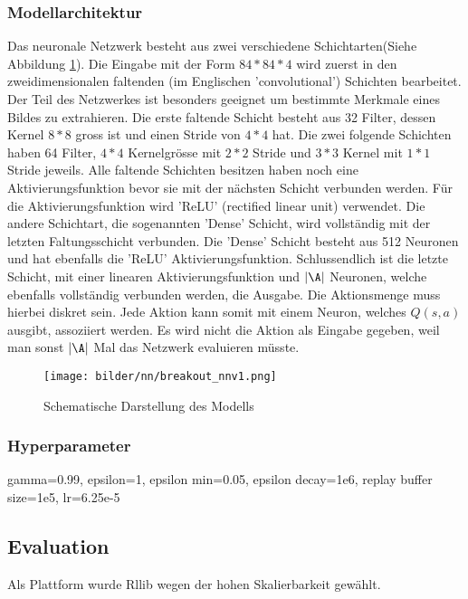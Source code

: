 \documentclass[a4paper,titlepage]{article}
\numberwithin{equation}{section} %
\begin{document}
{\subsubsection{Modellarchitektur}
Das neuronale Netzwerk besteht aus zwei verschiedene Schichtarten(Siehe Abbildung \ref{fig:breakout_nn}). Die Eingabe mit der Form $84*84*4$ wird zuerst in den zweidimensionalen faltenden (im Englischen 'convolutional') Schichten bearbeitet. Der Teil des Netzwerkes ist besonders geeignet um bestimmte Merkmale eines Bildes zu extrahieren\cite{fukushimaNeocognitronSelforganizingNeural1980}\cite{schmidhuberDeepLearningNeural2015}. Die erste faltende Schicht besteht aus 32 Filter, dessen Kernel $8*8$ gross ist und einen Stride von $4*4$ hat. Die zwei folgende Schichten haben 64 Filter, $4*4$ Kernelgrösse mit $2*2$ Stride und $3*3$ Kernel mit $1*1$ Stride jeweils. Alle faltende Schichten besitzen haben noch eine Aktivierungsfunktion bevor sie mit der nächsten Schicht verbunden werden. Für die Aktivierungsfunktion wird 'ReLU' (rectified linear unit) verwendet\cite{HierarchicalNeuralNetworks}. Die andere Schichtart, die sogenannten 'Dense' Schicht\cite{huangDenselyConnectedConvolutional2017}, wird vollständig mit der letzten Faltungsschicht verbunden. Die 'Dense' Schicht besteht aus 512 Neuronen und hat ebenfalls die 'ReLU' Aktivierungsfunktion. Schlussendlich ist die letzte Schicht, mit einer linearen Aktivierungsfunktion und $|\A|$ Neuronen, welche ebenfalls vollständig verbunden werden, die Ausgabe. Die Aktionsmenge muss hierbei diskret sein. Jede Aktion kann somit mit einem Neuron, welches $Q(s, a)$ ausgibt, assoziiert werden. Es wird nicht die Aktion als Eingabe gegeben, weil man sonst $|\A|$ Mal das Netzwerk evaluieren müsste.
\begin{figure}
	 \centering
	\texttt{[image: bilder/nn/breakout\_nnv1.png]}
	\caption{Schematische Darstellung des Modells}
	\label{fig:breakout_nn}
\end{figure}

\subsubsection{Hyperparameter}
gamma=0.99, epsilon=1, epsilon min=0.05, epsilon decay=1e6, replay buffer size=1e5, lr=6.25e-5


\subsection{Evaluation}
Als Plattform wurde Rllib wegen der hohen Skalierbarkeit gewählt. 
}
\end{document}
